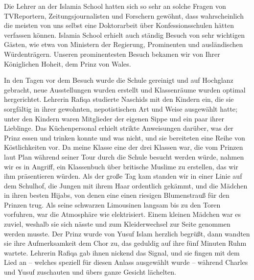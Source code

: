 \documentclass[12pt]{memoir}
\begin{document}
Die Lehrer an der Islamia School hatten sich so sehr an solche Fragen
von TV\–Reportern, Zeitungsjournalisten und Forschern gewöhnt,
dass wahrscheinlich die meisten von uns selbst
eine Doktorarbeit über Konfessionsschulen hätten verfassen können.
Islamia School erhielt auch ständig Besuch von sehr wichtigen Gästen,
wie etwa von Ministern der Regierung,
Prominenten und ausländischen Würdenträgern.
Unseren prominentesten Besuch bekamen wir von Ihrer Königlichen Hoheit,
dem Prinz von Wales.

In den Tagen vor dem Besuch wurde die Schule gereinigt
und auf Hochglanz gebracht,
neue Ausstellungen wurden erstellt
und Klassenräume wurden optimal hergerichtet.
Lehrerin Rafiqa studierte Naschids mit den Kindern ein,
die sie sorgfältig in ihrer gewohnten,
nepotistischen Art und Weise ausgewählt hatte;
unter den Kindern waren Mitglieder
der eigenen Sippe und ein paar ihrer Lieblinge.
Das Küchenpersonal erhielt strikte Anweisungen darüber,
was der Prinz essen und trinken konnte und was nicht,
und sie bereiteten eine Reihe von Köstlichkeiten vor.
Da meine Klasse eine der drei Klassen war,
die vom Prinzen laut Plan während seiner Tour
durch die Schule besucht werden würde, nahmen wir es in Angriff,
ein Klassenbuch über britische Muslime zu erstellen,
das wir ihm präsentieren würden.
Als der große Tag kam standen wir in einer Linie auf dem Schulhof,
die Jungen mit ihrem Haar ordentlich gekämmt,
und die Mädchen in ihren besten Hijabs,
von denen eine einen riesigen Blumenstrauß für den Prinzen trug.
Als seine schwarzen Limousinen langsam bis zu den Toren vorfuhren,
war die Atmosphäre wie elektrisiert.
Einem kleinen Mädchen war es zuviel,
weshalb sie sich nässte und zum Kleiderwechsel
zur Seite genommen werden musste.
Der Prinz wurde von Yusuf Islam herzlich begrüßt,
dann wandten sie ihre Aufmerksamkeit dem Chor zu,
das geduldig auf ihre fünf Minuten Ruhm wartete.
Lehrerin Rafiqa gab ihnen nickend das Signal,
und sie fingen mit dem Lied an –
welches speziell für diesen Anlass ausgewählt wurde –
während Charles und Yusuf zuschauten und übers ganze Gesicht lächelten.
\end{document}
